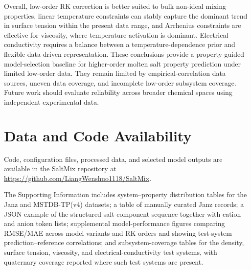 \documentclass[journal=jctcce,manuscript=article,doi=true]{achemso}
\begin{document}
Overall, low-order RK correction is better suited to bulk non-ideal mixing properties, linear temperature constraints can stably capture the dominant trend in surface tension within the present data range, and Arrhenius constraints are effective for viscosity, where temperature activation is dominant. Electrical conductivity requires a balance between a temperature-dependence prior and flexible data-driven representation. These conclusions provide a property-guided model-selection baseline for higher-order molten salt property prediction under limited low-order data. They remain limited by empirical-correlation data sources, uneven data coverage, and incomplete low-order subsystem coverage. Future work should evaluate reliability across broader chemical spaces using independent experimental data.

\section*{Data and Code Availability}

Code, configuration files, processed data, and selected model outputs are available in the SaltMix repository at \url{https://github.com/LiangWenshuo1118/SaltMix}.

\begin{suppinfo}
The Supporting Information includes system--property distribution tables for the Janz and MSTDB-TP(v4) datasets; a table of manually curated Janz records; a JSON example of the structured salt-component sequence together with cation and anion token lists; supplemental model-performance figures comparing RMSE/MAE across model variants and RK orders and showing test-system prediction--reference correlations; and subsystem-coverage tables for the density, surface tension, viscosity, and electrical-conductivity test systems, with quaternary coverage reported where such test systems are present.
\end{suppinfo}

\renewcommand{\refname}{References}

\end{document}
